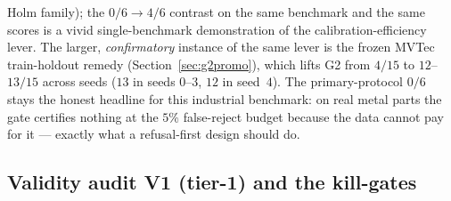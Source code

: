 \documentclass[preprint,11pt]{elsarticle}
\begin{document}
Holm family); the $0/6 \to 4/6$ contrast on the same benchmark and the same scores is a vivid
single-benchmark demonstration of the calibration-efficiency lever. The larger, \emph{confirmatory}
instance of the same lever is the frozen MVTec train-holdout remedy (Section~\ref{sec:g2promo}),
which lifts G2 from $4/15$ to $12$--$13/15$ across seeds ($13$ in seeds $0$--$3$, $12$ in seed~$4$).
The primary-protocol $0/6$ stays the honest headline for this industrial benchmark: on real metal
parts the gate certifies nothing at the $5\%$ false-reject budget because the data cannot pay for
it --- exactly what a refusal-first design should do.

\subsection{Validity audit V1 (tier-1) and the kill-gates}
\label{sec:v1res}
\end{document}
